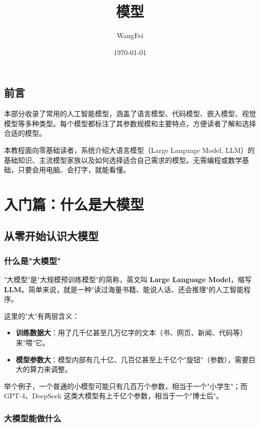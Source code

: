 \documentclass[12pt,UTF8]{ctexbook}
\title{\heiti\zihao{0} 模型}
\author{WangFei}
\date{\today}
\begin{document}
\maketitle
\tableofcontents

\frontmatter
\chapter{前言}

本部分收录了常用的人工智能模型，涵盖了语言模型、代码模型、嵌入模型、视觉模型等多种类型。每个模型都标注了其参数规模和主要特点，方便读者了解和选择合适的模型。

本教程面向零基础读者，系统介绍大语言模型（Large Language Model, LLM）的基础知识、主流模型家族以及如何选择适合自己需求的模型。无需编程或数学基础，只要会用电脑、会打字，就能看懂。

\mainmatter

\part{入门篇：什么是大模型}

\chapter{从零开始认识大模型}

\section{什么是"大模型"}

"大模型"是"大规模预训练模型"的简称，英文叫 \textbf{Large Language Model}，缩写 \textbf{LLM}。简单来说，就是一种"读过海量书籍、能说人话、还会推理"的人工智能程序。

这里的"大"有两层含义：
\begin{itemize}
  \item \textbf{训练数据大}：用了几千亿甚至几万亿字的文本（书、网页、新闻、代码等）来"喂"它。
  \item \textbf{模型参数大}：模型内部有几十亿、几百亿甚至上千亿个"旋钮"（参数），需要巨大的算力来调整。
\end{itemize}

举个例子，一个普通的小模型可能只有几百万个参数，相当于一个"小学生"；而 GPT-4、DeepSeek 这类大模型有上千亿个参数，相当于一个"博士后"。

\section{大模型能做什么}
\end{document}
